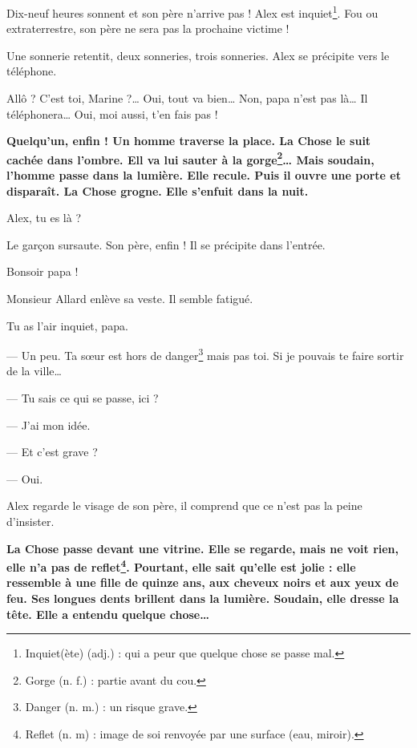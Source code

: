 Dix-neuf heures sonnent et son père n'arrive pas ! Alex est inquiet\footnote{Inquiet(ète) (adj.) : qui a peur que quelque chose se
passe mal.}. Fou ou extraterrestre, son père ne sera pas la prochaine victime !

Une sonnerie retentit, deux sonneries, trois sonneries. Alex se précipite vers le téléphone.

\og Allô ? C'est toi, Marine ?\ldots{} Oui, tout va bien\ldots{} Non, papa n'est pas là\ldots{} Il téléphonera\ldots{} Oui, moi
aussi, t'en fais pas ! \fg{}

\textbf{Quelqu'un, enfin ! Un homme traverse la place. La Chose le suit cachée dans l'ombre. Ell va lui sauter à la
gorge\footnote{Gorge (n. f.) : partie avant du cou.}\ldots{} Mais soudain, l'homme passe dans la lumière. Elle recule. Puis il
ouvre une porte et disparaît. La Chose grogne. Elle s'enfuit dans la nuit.}

\og Alex, tu es là ? \fg{}

Le gar\c{c}on sursaute. Son père, enfin ! Il se précipite dans l'entrée.

\og Bonsoir papa ! \fg{}

Monsieur Allard enlève sa veste. Il semble fatigué.

\og Tu as l'air inquiet, papa.

--- Un peu. Ta s\oe{}ur est hors de danger\footnote{Danger (n. m.) : un risque grave.} mais pas toi. Si je pouvais te faire sortir
    de la ville\ldots{}

--- Tu sais ce qui se passe, ici ?

--- J'ai mon idée.

--- Et c'est grave ?

--- Oui. \fg{}

Alex regarde le visage de son père, il comprend que ce n'est pas la peine d'insister.

\textbf{La Chose passe devant une vitrine. Elle se regarde, mais ne voit rien, elle n'a pas de reflet\footnote{Reflet (n. m) : image de
soi renvoyée par une surface (eau, miroir).}. Pourtant, elle sait qu'elle est jolie : elle ressemble à une fille de quinze ans,
aux cheveux noirs et aux yeux de feu. Ses longues dents brillent dans la lumière. Soudain, elle dresse la tête. Elle a entendu
quelque chose\ldots{}}
